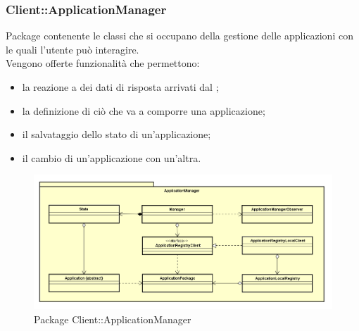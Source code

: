\subsubsection{Client::ApplicationManager}
Package contenente le classi che si occupano della gestione delle applicazioni con le quali l'utente può interagire.\\
Vengono offerte funzionalità che permettono:
\begin{itemize}
\item la reazione a dei dati di risposta arrivati dal ;
\item la definizione di ciò che va a comporre una applicazione;
\item il salvataggio dello stato di un'applicazione;
\item il cambio di un'applicazione con un'altra.
\end{itemize}
\begin{figure}[h] \centering \includegraphics[width=\textwidth,height=\textheight,keepaspectratio]{images/diagrams/client/Client/ApplicationManager.png}
	\caption{Package Client::ApplicationManager}
\end{figure}
\newpage

